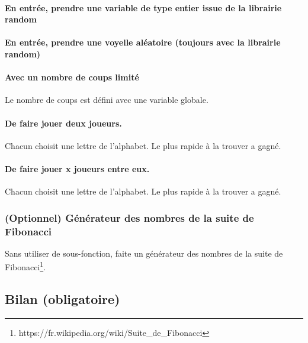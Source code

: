 \paragraph{En entrée, prendre une variable de type entier issue de la librairie random}
\paragraph{En entrée, prendre une voyelle aléatoire (toujours avec la librairie random)}
\paragraph{Avec un nombre de coups limité} Le nombre de coups est défini avec une variable globale.
\paragraph{De faire jouer deux joueurs.} Chacun choisit une lettre de l'alphabet. Le plus rapide à la trouver a gagné.
\paragraph{De faire jouer x joueurs entre eux.} Chacun choisit une lettre de l'alphabet. Le plus rapide à la trouver a gagné. 

\subsubsection{(Optionnel) Générateur des nombres de la suite de Fibonacci}
Sans utiliser de sous-fonction, faite un générateur des nombres de la suite de Fibonacci\footnote{https://fr.wikipedia.org/wiki/Suite\_de\_Fibonacci}.

\newpage

\subsection{Bilan (obligatoire)}






